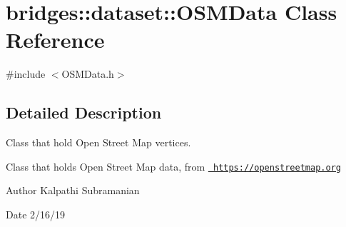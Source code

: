 \hypertarget{classbridges_1_1dataset_1_1_o_s_m_data}{}\section{bridges\+::dataset\+::O\+S\+M\+Data Class Reference}
\label{classbridges_1_1dataset_1_1_o_s_m_data}


{\ttfamily \#include $<$O\+S\+M\+Data.\+h$>$}



\subsection{Detailed Description}
Class that hold Open Street Map vertices. 

Class that holds Open Street Map data, from \href{https://openstreetmap.org}{\texttt{ https\+://openstreetmap.\+org}}

\begin{DoxyAuthor}{Author}
Kalpathi Subramanian 
\end{DoxyAuthor}
\begin{DoxyDate}{Date}
2/16/19 
\end{DoxyDate}
